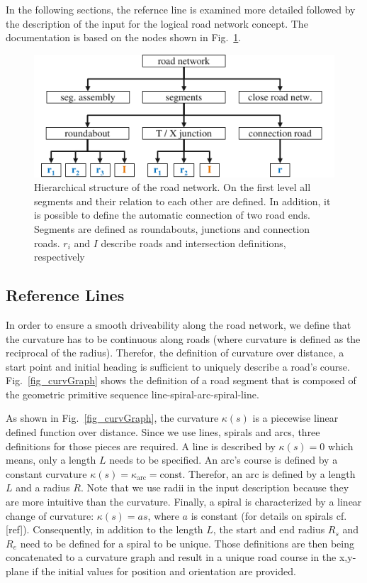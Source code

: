 \documentclass[a4paper, 10pt, conference]{ieeeconf}      %
\begin{document}
In the following sections, the refernce line is examined more detailed followed by the description of the input for the logical road network concept. The documentation is based on the nodes shown in Fig.~\ref{fig_schema}. 
\begin{figure}[thpb] 		
	\centering
	\includegraphics{fig/schema.pdf}
	\caption{Hierarchical structure of the road network. On the first level all segments and their relation to each other are defined. In addition, it is possible to define the automatic connection of two road ends. Segments are defined as roundabouts, junctions and connection roads. $r_i$ and $I$ describe roads and intersection definitions, respectively}
	\label{fig_schema}
\end{figure}
\subsection{Reference Lines} %
In order to ensure a smooth driveability along the road network, we define that the curvature has to be continuous along roads (where curvature is defined as the reciprocal of the radius). Therefor, the definition of curvature over distance, a start point and initial heading is sufficient to uniquely describe a road's course. Fig.~\ref{fig_curvGraph} shows the definition of a road segment that is composed of the geometric primitive sequence line-spiral-arc-spiral-line.

As shown in Fig.~\ref{fig_curvGraph}, the curvature $\kappa(s)$ is a piecewise linear defined function over distance. Since we use lines, spirals and arcs, three definitions for those pieces are required. A line is described by $\kappa(s) = 0$ which means, only a length $L$ needs to be specified. An arc's course is defined by a constant curvature $\kappa(s) = \kappa_\text{arc} = \text{const}$. Therefor, an arc is defined by a length $L$ and a radius $R$. Note that we use radii in the input description because they are more intuitive than the curvature. Finally, a spiral is characterized by a linear change of curvature: $\kappa(s) = a s$, where $a$ is constant (for details on spirals cf. [ref]). Consequently, in addition to the length $L$, the start and end radius $R_s$ and $R_e$ need to be defined for a spiral to be unique. Those definitions are then being concatenated to a curvature graph and result in a unique road course in the x,y-plane if the initial values for position and orientation are provided. 
\end{document}

